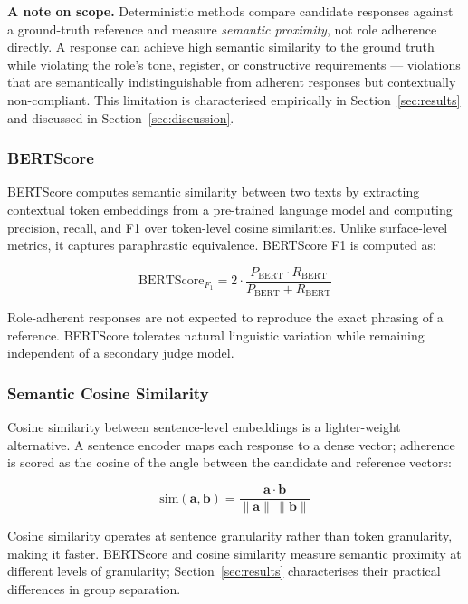 \documentclass[11pt,a4paper]{article}
\begin{document}
\textbf{A note on scope.} Deterministic methods compare candidate responses
against a ground-truth reference and measure \emph{semantic proximity}, not
role adherence directly. A response can achieve high semantic similarity to
the ground truth while violating the role's tone, register, or constructive
requirements --- violations that are semantically indistinguishable from
adherent responses but contextually non-compliant. This limitation is
characterised empirically in Section~\ref{sec:results} and discussed in
Section~\ref{sec:discussion}.

\subsubsection{BERTScore}

BERTScore \citep{zhang2020bertscore} computes semantic similarity between two
texts by extracting contextual token embeddings from a pre-trained language
model and computing precision, recall, and F1 over token-level cosine
similarities. Unlike surface-level metrics, it captures paraphrastic equivalence.
BERTScore F1 is computed as:

\begin{equation}
  \text{BERTScore}_{F_1} = 2 \cdot \frac{P_{\text{BERT}} \cdot R_{\text{BERT}}}
  {P_{\text{BERT}} + R_{\text{BERT}}}
\end{equation}

Role-adherent responses are not expected to reproduce the exact phrasing of a
reference. BERTScore tolerates natural linguistic variation while remaining
independent of a secondary judge model.

\subsubsection{Semantic Cosine Similarity}

Cosine similarity between sentence-level embeddings \citep{reimers2019sentencebert}
is a lighter-weight alternative. A sentence encoder maps each response to a
dense vector; adherence is scored as the cosine of the angle between the
candidate and reference vectors:

\begin{equation}
  \text{sim}(\mathbf{a}, \mathbf{b}) =
  \frac{\mathbf{a} \cdot \mathbf{b}}{\|\mathbf{a}\|\,\|\mathbf{b}\|}
\end{equation}

Cosine similarity operates at sentence granularity rather than token
granularity, making it faster. BERTScore and cosine similarity measure
semantic proximity at different levels of granularity; Section~\ref{sec:results}
characterises their practical differences in group separation.
\end{document}
